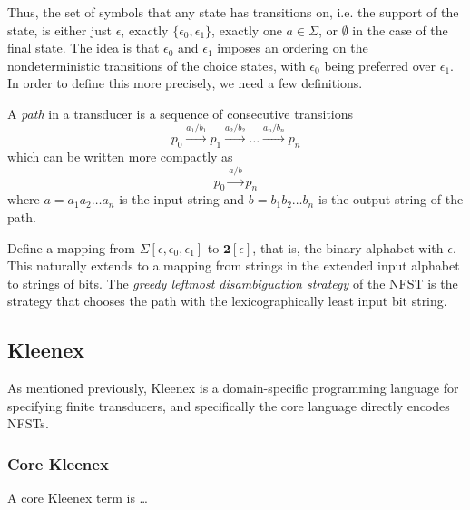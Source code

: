 Thus, the set of symbols that any state has transitions on, i.e. the support of
the state, is either just $\epsilon$, exactly $\{\epsilon_0, \epsilon_1\}$,
exactly one $a \in \Sigma$, or $\emptyset$ in the case of the final state. The
idea is that $\epsilon_0$ and $\epsilon_1$ imposes an ordering on the
nondeterministic transitions of the choice states, with $\epsilon_0$ being
preferred over $\epsilon_1$. In order to define this more precisely, we need a
few definitions.

A \emph{path} in a transducer is a sequence of consecutive
transitions
\[
  p_0 \xrightarrow{a_1/b_1} p_1 \xrightarrow{a_2/b_2} \dots
  \xrightarrow{a_n/b_n} p_n
\]
which can be written more compactly as
\[
  p_0 \xrightarrow{a/b} p_n
\]
where $a = a_1a_2 \dots a_n$ is the input string and $b = b_1b_2 \dots b_n$ is
the output string of the path.

Define a mapping from $\Sigma[\epsilon, \epsilon_0, \epsilon_1]$ to
$\mathbf{2}[\epsilon]$, that is, the binary alphabet with $\epsilon$. This
naturally extends to a mapping from strings in the extended input alphabet to
strings of bits. The \emph{greedy leftmost disambiguation strategy} of the NFST
is the strategy that chooses the path with the lexicographically least input
bit string.



\subsection{Kleenex}

As mentioned previously, Kleenex is a domain-specific programming language for
specifying finite transducers, and specifically the core language directly
encodes NFSTs.

\subsubsection{Core Kleenex}

\begin{definition}
  A core Kleenex term is  \dots
\end{definition}


